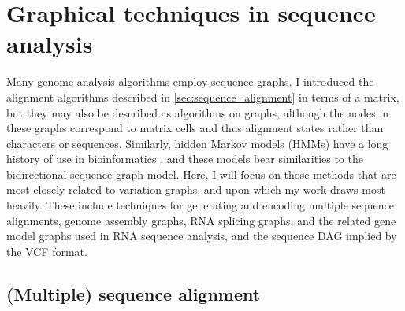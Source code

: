\section{Graphical techniques in sequence analysis}
\label{sec:graphical_techinques}

Many genome analysis algorithms employ sequence graphs.
I introduced the alignment algorithms described in \ref{sec:sequence_alignment} in terms of a matrix, but they may also be described as algorithms on graphs, although the nodes in these graphs correspond to matrix cells and thus alignment states rather than characters or sequences.
Similarly, hidden Markov models (HMMs) have a long history of use in bioinformatics \cite{durbin1998biological}, and these models bear similarities to the bidirectional sequence graph model.
Here, I will focus on those methods that are most closely related to variation graphs, and upon which my work draws most heavily.
These include techniques for generating and encoding multiple sequence alignments, genome assembly graphs, RNA splicing graphs, and the related gene model graphs used in RNA sequence analysis, and the sequence DAG implied by the VCF format.

\subsection{(Multiple) sequence alignment}
\label{sec:MSA}

